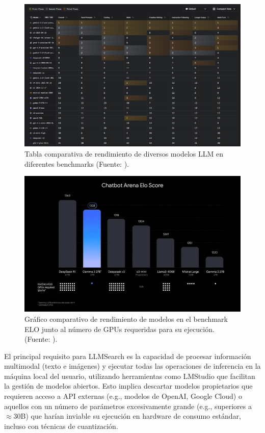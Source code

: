 \begin{figure}[H]
  \centering
  \includegraphics[width=\textwidth]{archivos/tabla_comparativa_modelos.png}
  \caption{Tabla comparativa de rendimiento de diversos modelos LLM en diferentes benchmarks (Fuente: \citep{noauthor_lmarena_nodate}).}
  \label{fig:tabla_comparativa_modelos}
\end{figure}

\begin{figure}[H]
  \centering
  \includegraphics[width=\textwidth]{archivos/elo_score_gemma_vs_deepseek.png}
  \caption{Gráfico comparativo de rendimiento de modelos en el benchmark ELO junto al número de GPUs requeridas para su ejecución. (Fuente: \citep{noauthor_gemma_nodate}).}
  \label{fig:graficas_rendimiento_modelos}
\end{figure}

El principal requisito para LLMSearch es la capacidad de procesar información multimodal (texto e imágenes) y ejecutar todas las operaciones de inferencia en la máquina local del usuario, utilizando herramientas como LMStudio que facilitan la gestión de modelos abiertos. Esto implica descartar modelos propietarios que requieren acceso a API externas (e.g., modelos de OpenAI, Google Cloud) o aquellos con un número de parámetros excesivamente grande (e.g., superiores a $\approx$30B) que harían inviable su ejecución en hardware de consumo estándar, incluso con técnicas de cuantización.

